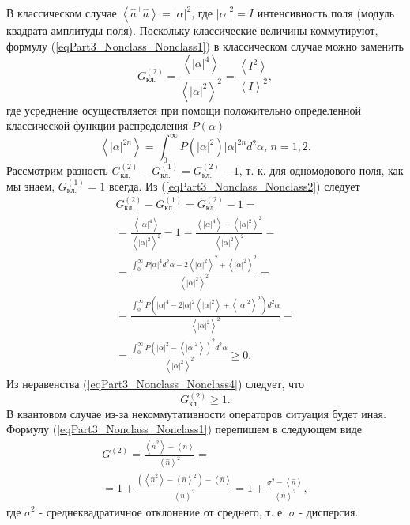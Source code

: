 В классическом случае $\left<\hat{a}^{+}\hat{a}\right> =
\left|\alpha\right|^2$, где $\left|\alpha\right|^2 = I$ интенсивность
поля (модуль квадрата амплитуды поля). Поскольку классические величины
коммутируют, формулу (\ref{eqPart3_Nonclass_Nonclass1}) в классическом
случае можно заменить
\begin{equation}
G^{(2)}_{\mbox{кл.}} = 
\frac{\left<\left|\alpha\right|^4\right>}{\left<\left|\alpha\right|^2\right>^2}
= 
\frac{\left<I^2\right>}{\left<I\right>^2},
\label{eqPart3_Nonclass_Nonclass2}
\end{equation}
где усреднение осуществляется при помощи положительно
определенной классической функции распределения $P\left(\alpha\right)$
\begin{equation}
\left<\left|\alpha\right|^{2n}\right> = 
\int_0^{\infty}P\left(\left|\alpha\right|^2\right)
\left|\alpha\right|^{2n}d^2\alpha, \, n=1,2.
\nonumber
\end{equation}
Рассмотрим разность 
$G^{(2)}_{\mbox{кл.}} - G^{(1)}_{\mbox{кл.}} = G^{(2)}_{\mbox{кл.}} -
1$, т. к. для одномодового поля, как мы знаем, $G^{(1)}_{\mbox{кл.}} =
1$ всегда. Из (\ref{eqPart3_Nonclass_Nonclass2}) следует
\begin{eqnarray}
G^{(2)}_{\mbox{кл.}} - G^{(1)}_{\mbox{кл.}} = G^{(2)}_{\mbox{кл.}} -
1 = 
\nonumber \\
=
\frac{\left<\left|\alpha\right|^4\right>}{\left<\left|\alpha\right|^2\right>^2}
- 1 = 
\frac{\left<\left|\alpha\right|^4\right> -
  \left<\left|\alpha\right|^2\right>^2}{\left<\left|\alpha\right|^2\right>^2}
= 
\nonumber \\
= \frac{\int_0^{\infty} P \left|\alpha\right|^4 d^2\alpha - 2
  \left<\left|\alpha\right|^2\right>^2 +
  \left<\left|\alpha\right|^2\right>^2}{\left<\left|\alpha\right|^2\right>^2}
= 
\nonumber \\
= 
\frac{\int_0^{\infty} P \left(\left|\alpha\right|^4  - 2
  \left|\alpha\right|^2
  \left<\left|\alpha\right|^2\right> +
  \left<\left|\alpha\right|^2\right>^2\right)d^2\alpha}
     {\left<\left|\alpha\right|^2\right>^2}
=
\nonumber \\
=
\frac{\int_0^{\infty} P \left(\left|\alpha\right|^2  - 
  \left<\left|\alpha\right|^2\right>\right)^2d^2\alpha}{\left<\left|\alpha\right|^2\right>^2}
\ge 0.
\label{eqPart3_Nonclass_Nonclass4}
\end{eqnarray}
Из неравенства (\ref{eqPart3_Nonclass_Nonclass4}) следует, что
\begin{equation}
G^{(2)}_{\mbox{кл.}} \ge 1.
\nonumber
\end{equation}
В квантовом случае из-за некоммутативности операторов ситуация будет
иная. Формулу (\ref{eqPart3_Nonclass_Nonclass1}) перепишем в следующем
виде
\begin{eqnarray}
G^{(2)} = \frac{\left<\hat{n}^2\right> - \left<\hat{n}\right>}{\left<\hat{n}\right>^2} = 
\nonumber \\
=
1 + \frac{\left(\left<\hat{n}^2\right> - \left<\hat{n}\right>^2\right) -
  \left<\hat{n}\right>}{\left<\hat{n}\right>^2} = 1 + \frac{\sigma^2 -
  \left<\hat{n}\right>}{\left<\hat{n}\right>^2}, 
\label{eqPart3_Nonclass_Nonclass6}
\end{eqnarray}
где $\sigma^2$ - среднеквадратичное отклонение от среднего,
т. е. $\sigma$ - дисперсия. 

